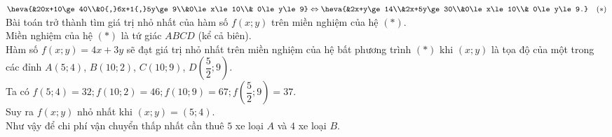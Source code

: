 \begin{bt}
{		$ \heva{&20x+10\ge 40\\&0{,}6x+1{,}5y\ge 9\\&0\le x\le 10\\& 0\le y\le 9}\Leftrightarrow \heva{&2x+y\ge 14\\&2x+5y\ge 30\\&0\le x\le 10\\& 0\le y\le 9.}\quad  (*)$\\
		Bài toán trở thành tìm giá trị nhỏ nhất của hàm số $ f(x;y) $ trên miền nghiệm của hệ $ (*) $.\\
		Miền nghiệm của
		hệ $ (*) $ là tứ giác $ ABCD $ (kể cả biên).\\
		Hàm số $ f(x;y)=4x+3y $ sẽ đạt giá trị nhỏ nhất trên miền nghiệm của hệ bất phương trình $ (*) $ khi $ (x;y) $ là tọa độ của một trong các đỉnh $ A(5;4) $, $B(10;2)  $, $ C(10;9) $, $ D\left(\dfrac{5}{2};9\right)$.\\
		Ta có $ f(5;4)=32; f(10;2)=46; f(10;9)=67; f\left(\dfrac{5}{2};9\right)=37$.\\
		Suy ra $ f(x;y) $ nhỏ nhất khi $ (x;y)=(5;4)$.\\
		Như vậy để chi phí vận chuyển thấp nhất cần thuê $ 5 $ xe loại $ A $ và $ 4 $ xe loại $ B$.
	}
\end{bt}

